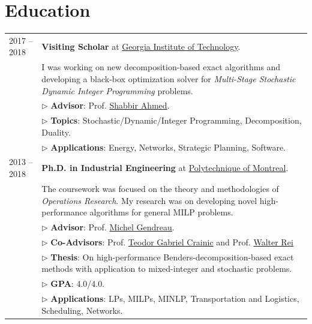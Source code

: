 \documentclass[10PT,letter]{article}
\newcommand{\numbox}[1]{} %
\begin{document}
\section*{\numbox{2}\bfseries\textcolor{titlecol}{\sffamily Education}}
        \begin{tabular}{lp{5.5in}}
	            \textsc{2017 -- 2018} & \textbf{Visiting Scholar} at \href{https://www.isye.gatech.edu}{Georgia Institute of Technology}.
	            \\[.5mm]
	            &  I was working on   new decomposition-based exact algorithms and  developing a black-box optimization solver for  \textit{Multi-Stage Stochastic Dynamic Integer Programming} problems.\\[.5mm]
	            & $\triangleright$ {\small\textbf{Advisor}}:  Prof. \href{https://www2.isye.gatech.edu/people/faculty/Shabbir_Ahmed/}{Shabbir Ahmed}.\\[1.1mm]
	            & $\triangleright$ {\small\textbf{Topics}}: Stochastic/Dynamic/Integer Programming, Decomposition, Duality.\\
	            & $\triangleright$ {\small\textbf{Applications}}: Energy, Networks, Strategic Planning,  Software.\\[4mm]
	            \textsc{2013 -- 2018} & \textbf{Ph.D. in Industrial Engineering} at \href{https://www.polymtl.ca/magi/}{Polytechnique of Montreal}.\\[.5mm]
	            & The coursework was   focused on the  theory and methodologies of \textit{Operations Research}. My research was  on developing novel high-performance algorithms for general MILP problems.\\[.5mm]
	            & $\triangleright$ {\small\textbf{Advisor}}:  Prof. \href{https://www.polymtl.ca/expertises/en/gendreau-michel}{Michel Gendreau}.\\[1.1mm]
	            & $\triangleright$ {\small\textbf{Co-Advisors}}:  Prof. \href{https://professeurs.uqam.ca/professeur?c=crainic.teodor}{Teodor Gabriel Crainic} and Prof. \href{https://professeurs.uqam.ca/professeur?c=rei.walter}{Walter Rei} \\[1.1mm]
	            & $\triangleright$ {\small\textbf{Thesis}}: On high-performance Benders-decomposition-based exact methods with application to mixed-integer and stochastic problems.\\
	            & $\triangleright$ {\small\textbf{GPA}}: 4.0/4.0.\\
	            & $\triangleright$ {\small\textbf{Applications}}: LPs, MILPs, MINLP, Transportation and Logistics, Scheduling, Networks.\\[4mm]

\end{tabular}
\end{document}
